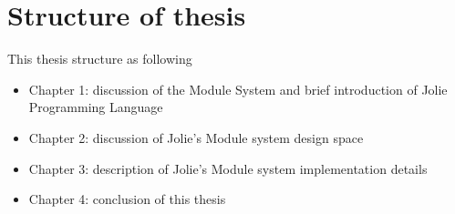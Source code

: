 \section*{Structure of thesis}

This thesis structure as following
\begin{itemize}
    \item Chapter 1: discussion of the Module System and brief introduction of Jolie Programming Language
    \item Chapter 2: discussion of Jolie's Module system design space
    \item Chapter 3: description of Jolie's Module system implementation details
    \item Chapter 4: conclusion of this thesis
\end{itemize}
 